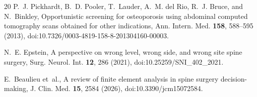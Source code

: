 \documentclass[aapm,mph,amsmath,amssymb,reprint]{revtex4-2}
\newif\ifcaptionlist \captionlistfalse
\begin{document}
\begin{thebibliography}{20}
P.~J. Pickhardt, B.~D. Pooler, T.~Lauder, A.~M. del Rio, R.~J. Bruce, and N.~Binkley,
\newblock Opportunistic screening for osteoporosis using abdominal computed tomography scans obtained for other indications,
\newblock Ann. Intern. Med. {\bf 158}, 588--595 (2013),
\newblock doi:10.7326/0003-4819-158-8-201304160-00003.

N.~E. Epstein,
\newblock A perspective on wrong level, wrong side, and wrong site spine surgery,
\newblock Surg. Neurol. Int. {\bf 12}, 286 (2021),
\newblock doi:10.25259/SNI\_402\_2021.

E.~Beaulieu et~al.,
\newblock A review of finite element analysis in spine surgery decision-making,
\newblock J. Clin. Med. {\bf 15}, 2584 (2026),
\newblock doi:10.3390/jcm15072584.

\end{thebibliography}

\ifcaptionlist\fi
\end{document}
